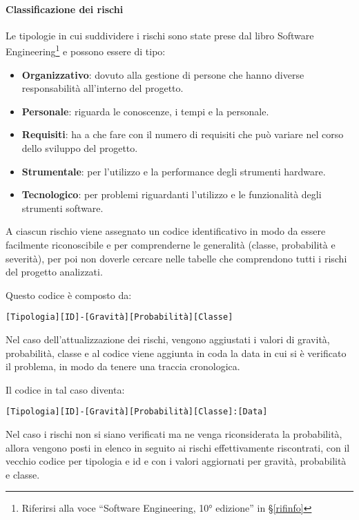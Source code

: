 			\paragraph{Classificazione dei rischi}\label{ClassificazioneRischi}
			Le tipologie in cui suddividere i rischi sono state prese dal libro Software
			Engineering\footnote{Riferirsi alla voce ``Software Engineering, 10° edizione'' in \S\ref{rifinfo}} e possono essere di tipo:
			\begin{itemize}
				\item \textbf{Organizzativo}: dovuto alla gestione di persone che hanno diverse responsabilità all'interno del progetto.
				\item \textbf{Personale}: riguarda le conoscenze, i tempi e la  personale.
				\item \textbf{Requisiti}: ha a che fare con il numero di requisiti che può variare nel corso dello sviluppo del progetto. %
				\item \textbf{Strumentale}: per l'utilizzo e la performance degli strumenti hardware.
				\item \textbf{Tecnologico}: per problemi riguardanti l'utilizzo e le funzionalità degli strumenti software.
			\end{itemize}

			A ciascun rischio viene assegnato un codice identificativo in modo da essere facilmente riconoscibile e per comprenderne le generalità
			(classe, probabilità e severità), per poi non doverle cercare nelle tabelle che comprendono tutti i rischi del progetto analizzati.

			Questo codice è composto da:

			\begin{center}
				\texttt{[Tipologia][ID]-[Gravità][Probabilità][Classe]}
			\end{center}

			Nel caso dell'attualizzazione dei rischi, vengono aggiustati i valori di gravità,
			probabilità, classe e al codice viene aggiunta in coda la data in cui si è verificato il problema, in modo da tenere una traccia cronologica.

			Il codice in tal caso diventa:

			\begin{center}
				\texttt{[Tipologia][ID]-[Gravità][Probabilità][Classe]:[Data]}
			\end{center}


			Nel caso i rischi non si siano verificati ma ne venga riconsiderata la probabilità, allora vengono posti in elenco in seguito ai rischi effettivamente
			riscontrati, con il vecchio codice per tipologia e id e con i valori aggiornati per gravità, probabilità e classe.

